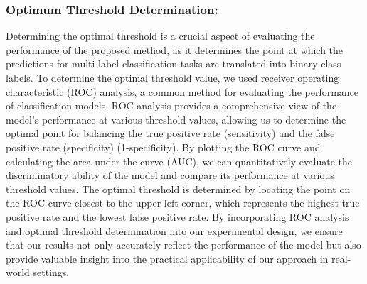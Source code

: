 \documentclass[review,1p,times,numbers]{elsarticle}
\begin{document}
\subsubsection{Optimum Threshold Determination:}
Determining the optimal threshold is a crucial aspect of evaluating the performance of the proposed method, as it determines the point at which the predictions for multi-label classification tasks are translated into binary class labels. To determine the optimal threshold value, we used receiver operating characteristic (ROC) analysis, a common method for evaluating the performance of classification models. ROC analysis provides a comprehensive view of the model's performance at various threshold values, allowing us to determine the optimal point for balancing the true positive rate (sensitivity) and the false positive rate (specificity) (1-specificity). By plotting the ROC curve and calculating the area under the curve (AUC), we can quantitatively evaluate the discriminatory ability of the model and compare its performance at various threshold values. The optimal threshold is determined by locating the point on the ROC curve closest to the upper left corner, which represents the highest true positive rate and the lowest false positive rate. By incorporating ROC analysis and optimal threshold determination into our experimental design, we ensure that our results not only accurately reflect the performance of the model but also provide valuable insight into the practical applicability of our approach in real-world settings.
\end{document}
